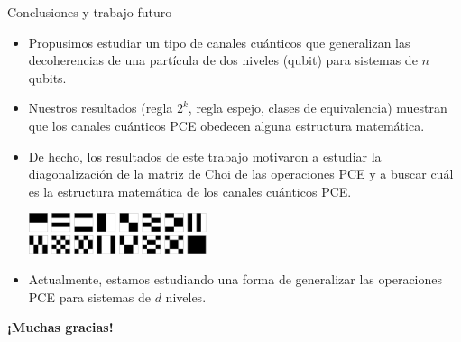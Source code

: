 \documentclass[xcolor=dvipsnames,presentation]{beamer}%
\begin{document}
\begin{frame}[t]{Conclusiones y trabajo futuro}
	\begin{itemize}
		\item Propusimos estudiar un tipo de canales cuánticos que generalizan  
		las decoherencias de una partícula de dos niveles (qubit) para sistemas de
		$n$ qubits.
		\item Nuestros resultados (regla $2^k$, regla espejo, clases de equivalencia) 
		muestran que los canales cuánticos PCE obedecen alguna estructura matemática.
		\item De hecho, los resultados de este trabajo motivaron a estudiar 
		la diagonalización de la matriz de Choi de las operaciones PCE y 
		a buscar cuál es la estructura matemática de los canales cuánticos PCE.
		\vspace*{1mm}\begin{center}
		\includegraphics[height=12mm]{portada}
		\end{center}
		\item Actualmente, estamos estudiando una forma de generalizar las 
		operaciones PCE para sistemas de $d$ niveles. 
	\end{itemize}
	
	\hfill \Large \bf ¡Muchas gracias!
\end{frame}
\end{document}
